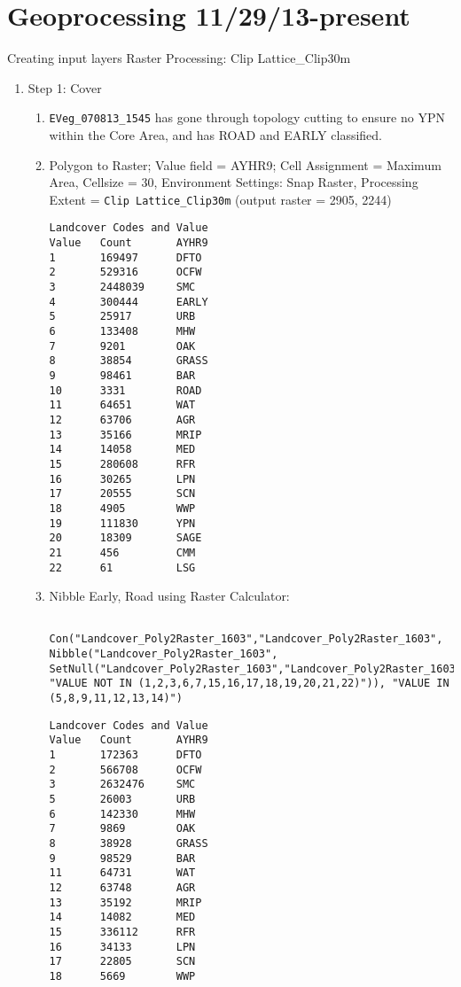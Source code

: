 \section{Geoprocessing 11/29/13-present}
Creating input layers
Raster Processing: Clip Lattice\_Clip30m
    \begin{enumerate}
    \item Step 1: Cover
        \begin{enumerate}
    \item \lstinline{EVeg_070813_1545} has gone through topology cutting to ensure no YPN within the Core Area, and has ROAD and EARLY classified. 
    \item Polygon to Raster; Value field = AYHR9; Cell Assignment = Maximum Area, Cellsize = 30, Environment Settings: Snap Raster, Processing Extent = \lstinline{Clip Lattice_Clip30m} (output raster = 2905, 2244)
    \begin{verbatim} 
Landcover Codes and Value
Value   Count       AYHR9
1       169497      DFTO
2       529316      OCFW
3       2448039     SMC
4       300444      EARLY
5       25917       URB
6       133408      MHW
7       9201        OAK
8       38854       GRASS
9       98461       BAR
10      3331        ROAD
11      64651       WAT
12      63706       AGR
13      35166       MRIP
14      14058       MED
15      280608      RFR
16      30265       LPN
17      20555       SCN
18      4905        WWP
19      111830      YPN
20      18309       SAGE
21      456         CMM
22      61          LSG
    \end{verbatim}
    \item Nibble Early, Road using Raster Calculator: \lstset{language=SQL}
    \begin{lstlisting}
    Con("Landcover_Poly2Raster_1603","Landcover_Poly2Raster_1603", Nibble("Landcover_Poly2Raster_1603", SetNull("Landcover_Poly2Raster_1603","Landcover_Poly2Raster_1603", "VALUE NOT IN (1,2,3,6,7,15,16,17,18,19,20,21,22)")), "VALUE IN (5,8,9,11,12,13,14)") 
    \end{lstlisting}
    \begin{verbatim} 
Landcover Codes and Value
Value   Count       AYHR9
1       172363      DFTO
2       566708      OCFW
3       2632476     SMC
5       26003       URB
6       142330      MHW
7       9869        OAK
8       38928       GRASS
9       98529       BAR
11      64731       WAT
12      63748       AGR
13      35192       MRIP
14      14082       MED
15      336112      RFR
16      34133       LPN
17      22805       SCN
18      5669        WWP

\end{verbatim}
\end{enumerate}
\end{enumerate}
